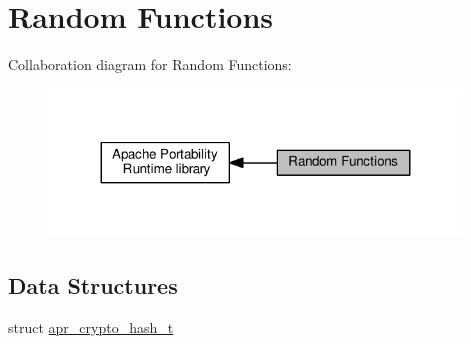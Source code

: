 \hypertarget{group__apr__random}{}\section{Random Functions}
\label{group__apr__random}
Collaboration diagram for Random Functions\+:
\nopagebreak
\begin{figure}[H]
\begin{center}
\leavevmode
\includegraphics[width=311pt]{group__apr__random}
\end{center}
\end{figure}
\subsection*{Data Structures}
\begin{DoxyCompactItemize}
\item 
struct \hyperlink{structapr__crypto__hash__t}{apr\+\_\+crypto\+\_\+hash\+\_\+t}
\end{DoxyCompactItemize}
